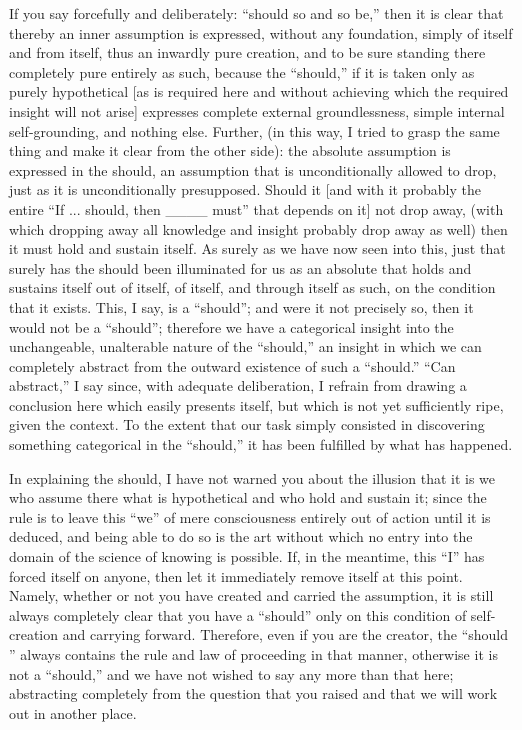 If you say forcefully and deliberately:
“should so and so be,” then it is clear that
thereby an inner assumption is expressed,
without any foundation, simply of itself and from itself,
thus an inwardly pure creation,
and to be sure standing there completely pure entirely as such,
because the “should,” if it is taken only as purely hypothetical
[as is required here and without achieving which
the required insight will not arise]
expresses complete external groundlessness,
simple internal self-grounding, and nothing else.
Further, (in this way, I tried to grasp the same thing
and make it clear from the other side):
the absolute assumption is expressed in the should,
an assumption that is unconditionally allowed to drop,
just as it is unconditionally presupposed.
Should it [and with it probably the entire
“If ... should, then ____ must”
that depends on it] not drop away,
(with which dropping away all knowledge and insight
probably drop away as well)
then it must hold and sustain itself.
As surely as we have now seen into this,
just that surely has the should been illuminated
for us as an absolute that holds and sustains itself
out of itself, of itself, and through itself as such,
on the condition that it exists.
This, I say, is a “should”;
and were it not precisely so,
then it would not be a “should”;
therefore we have a categorical insight
into the unchangeable, unalterable nature of the “should,”
an insight in which we can completely abstract
from the outward existence of such a “should.”
“Can abstract,” I say since, with adequate deliberation,
I refrain from drawing a conclusion here
which easily presents itself,
but which is not yet sufficiently ripe, given the context.
To the extent that our task simply consisted
in discovering something categorical in the “should,”
it has been fulfilled by what has happened.

In explaining the should, I have not warned you
about the illusion that it is we who assume there
what is hypothetical and who hold and sustain it;
since the rule is to leave this “we”
of mere consciousness entirely out of action until it is deduced,
and being able to do so is the art without which
no entry into the domain of the science of knowing is possible.
If, in the meantime, this “I” has forced itself on anyone,
then let it immediately remove itself at this point.
Namely, whether or not you have created and carried the assumption,
it is still always completely clear that you have a “should”
only on this condition of self-creation and carrying forward.
Therefore, even if you are the creator,
the “should ” always contains the rule and law
of proceeding in that manner,
otherwise it is not a “should,”
and we have not wished to say any more than that here;
abstracting completely from the question that you raised
and that we will work out in another place.

